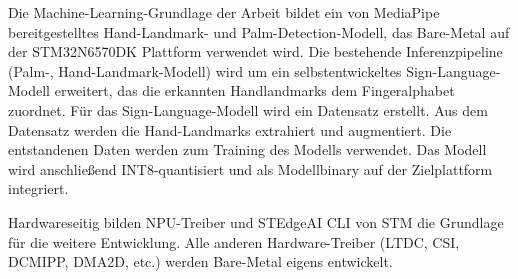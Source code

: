 Die Machine-Learning-Grundlage der Arbeit bildet ein von MediaPipe bereitgestelltes Hand-Landmark- und Palm-Detection-Modell, das Bare-Metal auf der STM32N6570DK Plattform verwendet wird. Die bestehende Inferenzpipeline (Palm-, Hand-Landmark-Modell) wird um ein selbstentwickeltes Sign-Language-Modell erweitert, das die erkannten Handlandmarks dem Fingeralphabet zuordnet. Für das Sign-Language-Modell wird ein Datensatz erstellt. Aus dem Datensatz werden die Hand-Landmarks extrahiert und augmentiert. Die entstandenen Daten werden zum Training des Modells verwendet. Das Modell wird anschließend INT8-quantisiert und als Modellbinary auf der Zielplattform integriert.

Hardwareseitig bilden NPU-Treiber und STEdgeAI CLI von STM die Grundlage für die weitere Entwicklung. Alle anderen Hardware-Treiber (LTDC, CSI, DCMIPP, DMA2D, etc.) werden Bare-Metal eigens entwickelt.
